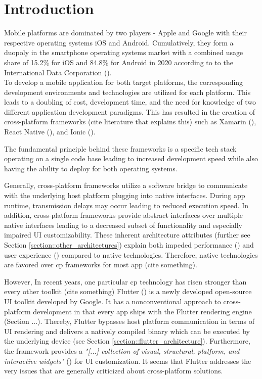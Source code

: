 \chapter{Introduction}
\label{section:introduction}
Mobile platforms are dominated by two players - Apple and Google with their respective operating systems iOS and Android. 
Cumulatively, they form a duopoly in the smartphone operating systems market with a combined usage share of 
15.2\% for iOS and 84.8\% for Android in 2020 according to to the International Data Corporation (\cite{IDC2021}).
\\To develop a mobile application for both target platforms, the corresponding development environments and technologies 
are utilized for each platform. This leads to a doubling of cost, development time, and 
the need for knowledge of two different application development paradigms. 
This has resulted in the creation of cross-platform frameworks (cite literature that explains this) such as Xamarin (\cite{Xamarin2021}), React Native (\cite{Facebook2021}), and Ionic (\cite{Ionic2021}). 

The fundamental principle behind these frameworks is a specific tech stack operating on a single code base leading to increased development speed
while also having the ability to deploy for both operating systems.

Generally, cross-platform frameworks utilize a software bridge to communicate with the underlying host platform plugging into 
native interfaces. During app runtime, transmission delays may occur leading to reduced execution speed. In addition, 
cross-platform frameworks provide abstract interfaces over multiple native interfaces leading to a decreased subset of functionality
and especially impaired UI customizability. These inherent architecture attributes (further see Section \ref{section::other_architectures}) explain
both impeded performance (\cite{Ebone2018}) and user experience (\cite{Mercado2016}) compared to native technologies. 
Therefore, native technologies are favored over cp frameworks for most app (cite something).

However, In recent years, one particular cp technology has risen stronger than every other toolkit (cite something)
Flutter (\cite{FlutterDev20}) is a newly developed open-source UI toolkit developed by Google. 
It has a nonconventional approach to cross-platform development in that every app ships with the Flutter rendering engine (Section ...). 
Thereby, Flutter bypasses host platform communication in terms of UI rendering and delivers a natively compiled binary 
which can be executed by the underlying device (see Section \ref{section::flutter_architecture}).
Furthermore, the framework provides a \textit{"[...] collection of visual, structural, platform, and interactive widgets"} (\textcite{GoogleWidgets2021}) for UI customization.
It seems that Flutter addresses the very issues that are generally criticized about cross-platform solutions.

